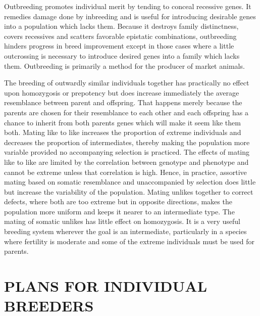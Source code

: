 Outbreeding promotes individual merit by tending to conceal recessive
genes. It remedies damage done by inbreeding and is useful for
introducing desirable genes into a population which lacks them.
Because it destroys family distinctness, covers recessives and scatters
favorable epistatic combinations, outbreeding hinders progress in breed
improvement except in those cases where a little outcrossing is necessary
to introduce desired genes into a family which lacks them. Outbreeding
is primarily a method for the producer of market animals.

The breeding of outwardly similar individuals together has practically
no effect upon homozygosis or prepotency but does increase
immediately the average resemblance between parent and offspring.
That happens merely because the parents are chosen for their resemblance
to each other and each offspring has a chance to inherit from
both parents genes which will make it seem like them both. Mating like
to like increases the proportion of extreme individuals and decreases
the proportion of intermediates, thereby making the population more
variable provided no accompanying selection is practiced. The effects of
mating like to like are limited by the correlation between genotype and
phenotype and cannot be extreme unless that correlation is high.
Hence, in practice, assortive mating based on somatic resemblance and
unaccompanied by selection does little but increase the variability of
the population. Mating unlikes together to correct defects, where both
are too extreme but in opposite directions, makes the population more
uniform and keeps it nearer to an intermediate type. The mating of somatic
unlikes has little effect on homozygosis. It is a very useful breeding
system wherever the goal is an intermediate, particularly in a species
where fertility is moderate and some of the extreme individuals must be
used for parents.

\section*{PLANS FOR INDIVIDUAL BREEDERS}

